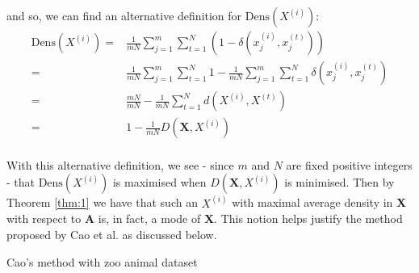 and so, we can find an alternative definition for \(\text{Dens}(X^{(i)})\):
\begin{equation}
\begin{aligned}
    \text{Dens}(X^{(i)}) = {} & {} \frac{1}{mN} \sum_{j=1}^m \sum_{t=1}^N 
                         (1 - \delta(x_j^{(i)}, x_j^{(t)}))
    \\
			             = {} & {} \frac{1}{mN} \sum_{j=1}^m \sum_{t=1}^N 1 - 
                         \frac{1}{mN} \sum_{j=1}^m \sum_{t=1}^N 
                         \delta(x_j^{(i)}, x_j^{(t)})
    \\
                         = {} & {} \frac{mN}{mN} - \frac{1}{mN} \sum_{t=1}^N 
                         d(X^{(i)}, X^{(t)})
    \\
			             = {} & {} 1 - \frac{1}{mN} D(\textbf{X}, X^{(i)})
\end{aligned}
\end{equation}\\

With this alternative definition, we see - since \(m\) and \(N\) are fixed 
positive integers - that \(\text{Dens}(X^{(i)})\) is maximised when 
\(D(\textbf{X}, X^{(i)})\) is minimised. Then by Theorem \ref{thm:1} we have
that such an \(X^{(i)}\) with maximal average density in \textbf{X} with respect
to \textbf{A} is, in fact, a mode of \textbf{X}. This notion helps justify the 
method proposed by Cao et al. as discussed below.\\



\begin{example}\label{ex:cao}
    Cao's method with zoo animal dataset
\end{example}

